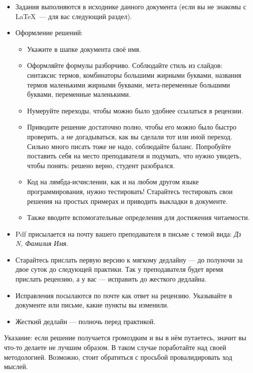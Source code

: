 \documentclass{article}
\begin{document}
    \begin{itemize}
        \item Задания выполняются в исходнике данного документа (если вы не знакомы с \LaTeX~--- для вас следующий раздел).
        \item Оформление решений:
        \begin{itemize}
            \item Укажите в шапке документа своё имя.
            \item Оформляйте формулы разборчиво.
            Соблюдайте стиль из слайдов: синтаксис термов, комбинаторы большими жирными буквами, названия термов маленькими жирными буквами, мета-переменные большими буквами, переменные маленькими.
            \item Нумеруйте переходы, чтобы можно было удобнее ссылаться в рецензии.
            \item Приводите решение достаточно полно, чтобы его можно было быстро проверить, а не догадываться, как вы сделали тот или иной переход.
            Сильно много писать тоже не надо, соблюдайте баланс.
            Попробуйте поставить себя на место преподавателя и подумать, что нужно увидеть, чтобы понять: решено верно, студент разобрался.
            \item Код на лямбда-исчислении, как и на любом другом языке программирования, нужно тестировать!
            Старайтесь тестировать свои решения на простых примерах и приводить выкладки в документе.
            \item Также вводите вспомогательные определения для достижения читаемости.
        \end{itemize}
        \item Pdf присылается на почту вашего преподавателя в письме с темой вида: \textit{Дз N, Фамилия Имя}.
        \item Старайтесь прислать первую версию к мягкому дедлайну --- до полуночи за двое суток до следующей практики.
        Так у преподавателя будет время прислать рецензию, а у вас --- исправить до жесткого дедлайна.
        \item Исправления посылаются по почте как ответ на рецензию.
        Указывайте в документе или письме, какие пункты вы изменили.
        \item Жесткий дедлайн --- полночь перед практикой.
    \end{itemize}

    Указание: если решение получается громоздким и вы в нём путаетесь, значит вы что-то делаете не лучшим образом.
    В таком случае поработайте над своей методологией.
    Возможно, стоит обратиться с просьбой провалидировать ход мыслей.
\end{document}
